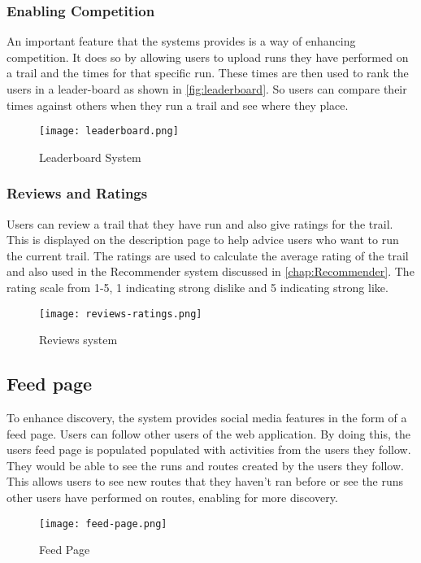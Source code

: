 \subsubsection{Enabling Competition}
An important feature that the systems provides is a way of enhancing competition. It does so by allowing users to upload runs they have performed on a trail and the times for that specific run. These times are then used to rank the users in a leader-board as shown in \autoref{fig:leaderboard}. So users can compare their times against others when they run a trail and see where they place. 

\begin{figure}[htb!]
    \centering
    \texttt{[image: leaderboard.png]}
    \caption{Leaderboard System}
    \label{fig:leaderboard}
\end{figure}

\subsubsection{Reviews and Ratings}
Users can review a trail that they have run and also give ratings for the trail. This is displayed on the description page to help advice users who want to run the current trail. The ratings are used to calculate the average rating of the trail and also used in the Recommender system discussed in \autoref{chap:Recommender}. The rating scale \cite{wright1982rating} from 1-5, 1 indicating strong dislike and 5 indicating strong like.

\begin{figure}[htb!]
    \centering
    \texttt{[image: reviews-ratings.png]}
    \caption{Reviews system}
    \label{fig:reviews}
\end{figure}

\subsection{Feed page}
To enhance discovery, the system provides social media features in the form of a feed page. Users can follow other users of the web application. By doing this, the users feed page is populated populated with activities from the users they follow. They would be able to see the runs and routes created by the users they follow. This allows users to see new routes that they haven't ran before or see the runs other users have performed on routes, enabling for more discovery.

\begin{figure}[htb!]
    \centering
    \texttt{[image: feed-page.png]}
    \caption{Feed Page}
    \label{fig:feedPage}
\end{figure}




